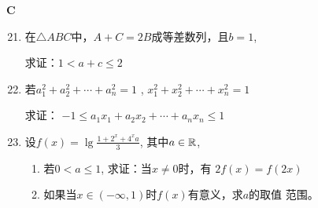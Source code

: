 \begin{center}
    \bfseries C
\end{center}

\begin{enumerate}\setcounter{enumi}{20}
    \item 在$\triangle ABC$中，$A+C=2B$成等差数列，且$b=1$,
    
求证：$1<a+c\leqslant2$

\item 若$a_{1}^{2}+ a_{2}^{2}+ \cdots + a_{n}^{2}= 1$ , $x_{1}^{2}+ x_{2}^{2}+ \cdots + x_{n}^{2}= 1$

求证： $-1\leqslant a_1x_1+a_2x_2+\cdots+a_nx_n\leqslant1$
\item 设$f(x)=\lg\frac{1+2^{x}+4^{x}a}{3}$, 其中$a\in \mathbb{R}$,
\begin{enumerate}[(1)]
    \item 若$0<a\leqslant1$, 求证：当$x\neq0$时，有
    $2f(x)=f(2x)$
    \item 如果当$x\in(-\infty,1)$时$f(x)$有意义，求$a$的取值
    范围。
\end{enumerate}

\end{enumerate}